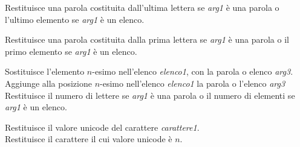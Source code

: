 Restituisce una parola costituita dall'ultima lettera se \textit{arg1} è una parola o l'ultimo elemento se \textit{arg1} è un elenco.

Restituisce una parola costituita dalla prima lettera se \textit{arg1} è una parola o il primo elemento se \textit{arg1} è un elenco.

Sostituisce l'elemento $n$-esimo nell'elenco \textit{elenco1}, con la parola o elenco \textit{arg3}.\\

Aggiunge alla posizione $n$-esimo nell'elenco \textit{elenco1} la parola o l'elenco \textit{arg3}\\

Restituisce il numero di lettere se \textit{arg1} è una parola o il numero di elementi se \textit{arg1} è un elenco.

Restituisce il valore unicode del carattere \textit{carattere1}. \\

\label{car}Restituisce il carattere il cui valore unicode è $n$.\\


